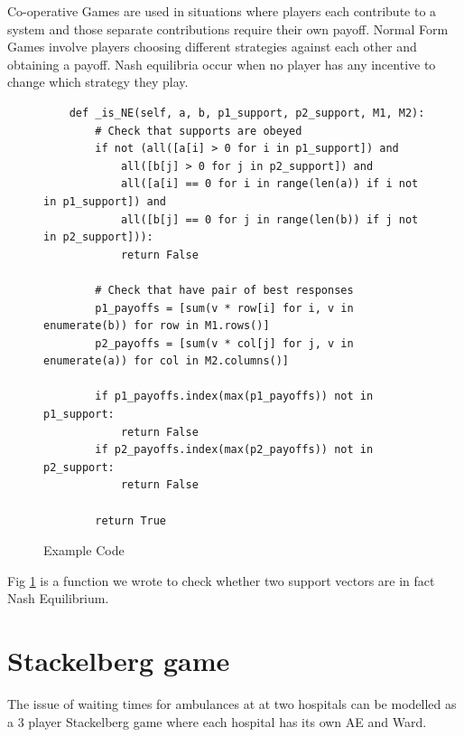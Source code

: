 \documentclass[a0,landscape]{a0poster}
\begin{document}
\begin{multicols}{3}
Co-operative Games are used in situations where players each contribute to a system and those separate contributions require their own payoff.
Normal Form Games involve players choosing different strategies against each other and obtaining a payoff.
Nash equilibria occur when no player has any incentive to change which strategy they play.

\begin{figure}[H]
\color{black}
\begin{verbatim}
    def _is_NE(self, a, b, p1_support, p2_support, M1, M2):
        # Check that supports are obeyed
        if not (all([a[i] > 0 for i in p1_support]) and
            all([b[j] > 0 for j in p2_support]) and
            all([a[i] == 0 for i in range(len(a)) if i not in p1_support]) and
            all([b[j] == 0 for j in range(len(b)) if j not in p2_support])):
            return False

        # Check that have pair of best responses
        p1_payoffs = [sum(v * row[i] for i, v in enumerate(b)) for row in M1.rows()]
        p2_payoffs = [sum(v * col[j] for j, v in enumerate(a)) for col in M2.columns()]

        if p1_payoffs.index(max(p1_payoffs)) not in p1_support:
            return False
        if p2_payoffs.index(max(p2_payoffs)) not in p2_support:
            return False

        return True
\end{verbatim}
\caption{Example Code}
\label{fig:check_NE}
\end{figure}

Fig \ref{fig:check_NE} is a function we wrote to check whether two support vectors are in fact Nash Equilibrium.


\color{Goldenrod}
\section*{Stackelberg game}
The issue of waiting times for ambulances at at two hospitals can be modelled as a 3 player Stackelberg game where each hospital has its own AE and Ward.



\end{multicols}
\end{document}

